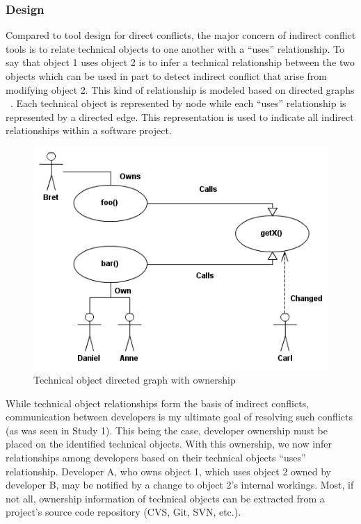 \subsubsection{Design}
Compared to tool design for direct conflicts, the major concern of 
indirect conflict tools is to relate technical objects to one another
with a ``uses'' relationship. To say that object 1 uses object 2 is to infer
a technical relationship between the two objects which can be used
in part to detect indirect conflict that arise from modifying object
2. This kind of relationship is modeled based on directed graphs ~\cite{Horwitz:1992:UPD}. 
Each technical object is represented by node while each ``uses''
relationship is represented by a directed edge. This representation
is used to indicate all indirect relationships within a software project.

\begin{figure}[t!]
\includegraphics[width=\columnwidth]{figures/CallGraph}
\caption{Technical object directed graph with ownership\label{fig:graph}}
\end{figure}

While technical object relationships form the basis of indirect conflicts,
communication between developers is my ultimate goal of resolving such conflicts
(as was seen in Study 1).
This being the case, developer ownership must be placed on the 
identified technical objects. With this ownership, we now infer
relationships among developers based on their technical objects
``uses'' relationship. Developer A, who owns object 1, which uses 
object 2 owned by developer B, may be notified by a change to
object 2's internal workings. Most, if not all, ownership information
of technical objects can be extracted from a project's source code
repository (CVS, Git, SVN, etc.).

